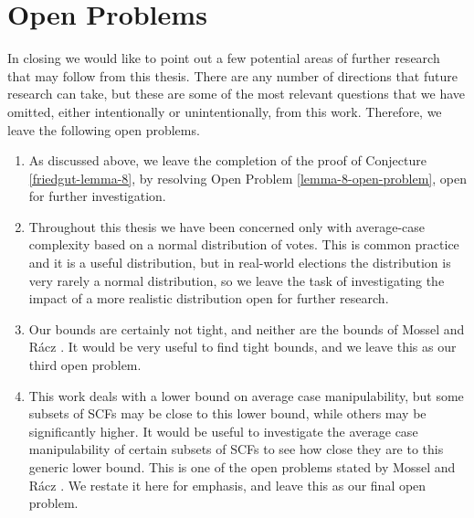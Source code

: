 \section{Open Problems}
	In closing we would like to point out a few potential areas of further research that may follow from this thesis. There are any number of directions that future research can take, but these are some of the most relevant questions that we have omitted, either intentionally or unintentionally, from this work. Therefore, we leave the following open problems.

	\begin{enumerate}
		\item As discussed above, we leave the completion of the proof of Conjecture \ref{friedgut-lemma-8}, by resolving Open Problem \ref{lemma-8-open-problem}, open for further investigation.
		\item Throughout this thesis we have been concerned only with average-case complexity based on a normal distribution of votes. This is common practice and it is a useful distribution, but in real-world elections the distribution is very rarely a normal distribution, so we leave the task of investigating the impact of a more realistic distribution open for further research.
		\item Our bounds are certainly not tight, and neither are the bounds of Mossel and R\'{a}cz \cite{mossel2011quantitative}. It would be very useful to find tight bounds, and we leave this as our third open problem.
		\item This work deals with a lower bound on average case manipulability, but some subsets of SCFs may be close to this lower bound, while others may be significantly higher. It would be useful to investigate the average case manipulability of certain subsets of SCFs to see how close they are to this generic lower bound. This is one of the open problems stated by Mossel and R\'{a}cz \cite{mossel2011quantitative}. We restate it here for emphasis, and leave this as our final open problem.
	\end{enumerate}

